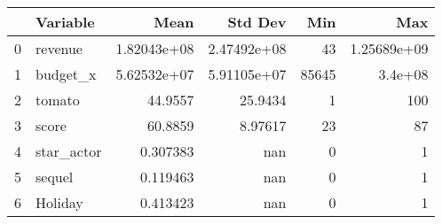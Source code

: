 \begin{tabular}{rlrrrr}
\toprule
    & Variable   &         Mean &       Std Dev &   Min &           Max \\
\midrule
  0 & revenue    &  1.82043e+08 &   2.47492e+08 &    43 &   1.25689e+09 \\
  1 & budget\_x   &  5.62532e+07 &   5.91105e+07 & 85645 &   3.4e+08     \\
  2 & tomato     & 44.9557      &  25.9434      &     1 & 100           \\
  3 & score      & 60.8859      &   8.97617     &    23 &  87           \\
  4 & star\_actor &  0.307383    & nan           &     0 &   1           \\
  5 & sequel     &  0.119463    & nan           &     0 &   1           \\
  6 & Holiday    &  0.413423    & nan           &     0 &   1           \\
\bottomrule
\end{tabular}